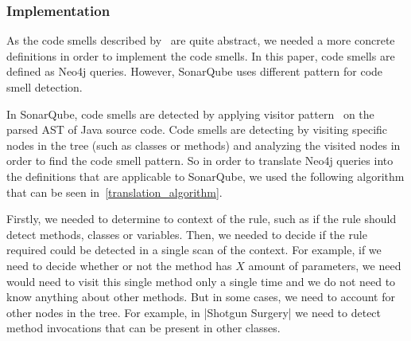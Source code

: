 
\subsubsection{Implementation}


As the code smells described by~\citeauthor{refactoring-fowler} are quite abstract, we needed
a more concrete definitions in order to implement the code smells.
In this paper, code smells are defined as Neo4j queries.
However, SonarQube uses different pattern for code smell detection.

In SonarQube, code smells are detected by applying visitor pattern~\cite{visitor_pattern} on the parsed
AST of Java source code.
Code smells are detecting by visiting specific nodes in the tree (such as classes or methods) and analyzing
the visited nodes in order to find the code smell pattern.
So in order to translate Neo4j queries into the definitions that are applicable to SonarQube, we used the following
algorithm that can be seen in~\ref{translation_algorithm}.

Firstly, we needed to determine to context of the rule, such as if the rule should detect methods, classes or variables.
Then, we needed to decide if the rule required could be detected in a single scan of the context.
For example, if we need to decide whether or not the method has $X$ amount of parameters, we need would need to visit
this single method only a single time and we do not need to know anything about other methods.
But in some cases, we need to account for other nodes in the tree.
For example, in \verbatim|Shotgun Surgery| we need to detect method invocations that can be present in other classes.

